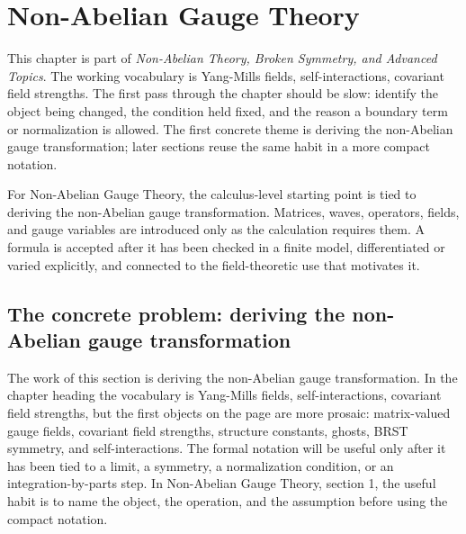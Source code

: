 \chapter{Non-Abelian Gauge Theory}


This chapter is part of \emph{Non-Abelian Theory, Broken Symmetry, and Advanced Topics}.  The working vocabulary is Yang-Mills fields, self-interactions, covariant field strengths.  The first pass through the chapter should be slow: identify the object being changed, the condition held fixed, and the reason a boundary term or normalization is allowed.  The first concrete theme is deriving the non-Abelian gauge transformation; later sections reuse the same habit in a more compact notation.

For Non-Abelian Gauge Theory, the calculus-level starting point is tied to deriving the non-Abelian gauge transformation.  Matrices, waves, operators, fields, and gauge variables are introduced only as the calculation requires them.  A formula is accepted after it has been checked in a finite model, differentiated or varied explicitly, and connected to the field-theoretic use that motivates it.

\section{The concrete problem: deriving the non-Abelian gauge transformation}













The work of this section is deriving the non-Abelian gauge transformation.  In the chapter heading the vocabulary is Yang-Mills fields, self-interactions, covariant field strengths, but the first objects on the page are more prosaic: matrix-valued gauge fields, covariant field strengths, structure constants, ghosts, BRST symmetry, and self-interactions.  The formal notation will be useful only after it has been tied to a limit, a symmetry, a normalization condition, or an integration-by-parts step.  In Non-Abelian Gauge Theory, section 1, the useful habit is to name the object, the operation, and the assumption before using the compact notation.

